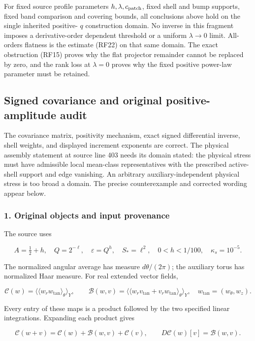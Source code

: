 \documentclass[10pt,a4paper]{article}
\begin{document}
For fixed source profile parameters \(h,\lambda,c_{\rm patch}\),
fixed shell and bump supports, fixed band comparison and covering
bounds, all conclusions above hold on the single inherited positive-
\(q\) construction domain. No inverse in this fragment imposes a
derivative-order dependent threshold or a uniform \(\lambda\to0\)
limit. All-orders flatness is the estimate (RF22) on that same domain.
The exact obstruction (RF15) proves why the flat projector remainder
cannot be replaced by zero, and the rank loss at \(\lambda=0\)
proves why the fixed positive power-law parameter must be retained.


\subsection{Signed covariance and original positive-amplitude audit}


The covariance matrix, positivity mechanism, exact signed differential inverse, shell weights, and displayed increment exponents are correct. The physical assembly statement at source line 403 needs its domain stated: the physical stress must have admissible local mean-class representatives with the prescribed active-shell support and edge vanishing. An arbitrary auxiliary-independent physical stress is too broad a domain. The precise counterexample and corrected wording appear below.

\subsubsection{1. Original objects and input provenance}

The source uses

\[
A=\tfrac12+h,\quad Q=2^{-\ell},\quad \varepsilon=Q^h,
\quad S_*=\ell^2,\quad 0<h<1/100,\quad \kappa_s=10^{-5}.
\]

The normalized angular average has measure \(d\theta/(2\pi)\); the auxiliary torus has normalized Haar measure. For real extended vector fields,

\[
\mathcal C(w)=\langle\langle w_rw_{\tan}\rangle_\theta\rangle_Y,
\qquad
\mathcal B(w,v)=\langle\langle w_rv_{\tan}+v_rw_{\tan}\rangle_\theta\rangle_Y,
\quad w_{\tan}=(w_\theta,w_z).
\]

Every entry of these maps is a product followed by the two specified linear integrations. Expanding each product gives

\[
\mathcal C(w+v)=\mathcal C(w)+\mathcal B(w,v)+\mathcal C(v),
\qquad D\mathcal C(w)[v]=\mathcal B(w,v).
\]
\end{document}
